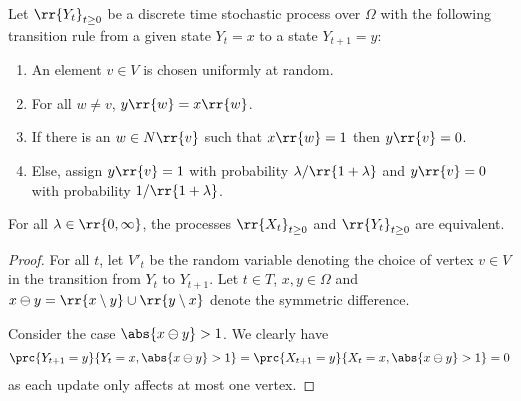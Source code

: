 \documentclass{article}
\begin{document}
\begin{claim*}[1]
  Let $\rr{Y_t}_{t\geq 0}$ be a discrete time stochastic process over $\Omega$ with the
  following transition rule from a given state $Y_t=x$ to a state $Y_{t+1}=y$:
  \begin{enumerate}
    \item An element $v\in V$ is chosen uniformly at random.
    \item For all $w\neq v$, $y\rr{w}=x\rr{w}$.
    \item If there is an $w\in N\rr{v}$ such that $x\rr{w}=1$ then $y\rr{v}=0$.
    \item Else, assign $y\rr{v}=1$ with probability $\lambda/\rr{1+\lambda}$ and $y\rr{v}=0$
      with probability $1/\rr{1+\lambda}$.
  \end{enumerate}
  For all $\lambda\in\rr{0,\infty}$, the processes $\rr{X_t}_{t\geq 0}$ and $\rr{Y_t}_{t\geq 0}$ are equivalent.
  \begin{proof}
    For all $t$, let $V'_t$ be the random variable denoting the choice of vertex $v\in V$ in the
    transition from $Y_t$ to $Y_{t+1}$.
    Let $t\in T$, $x,y\in\Omega$ and $x\ominus y=\rr{x\setminus y}\cup\rr{y\setminus x}$
    denote the symmetric difference.

    Consider the case $\abs{x\ominus y}>1$. We clearly have
    \begin{align*}
      \prc{Y_{t+1}=y}{Y_t=x, \abs{x\ominus y}>1} = \prc{X_{t+1}=y}{X_t=x, \abs{x\ominus y}>1} = 0
    \end{align*}
    as each update only affects at most one vertex.


\end{proof}
\end{claim*}
\end{document}

